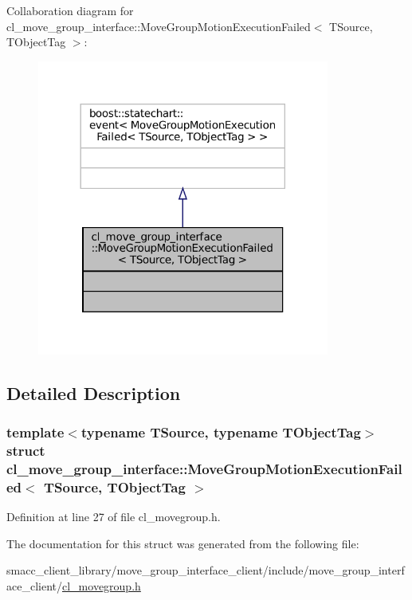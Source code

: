 Collaboration diagram for cl\+\_\+move\+\_\+group\+\_\+interface\+:\+:Move\+Group\+Motion\+Execution\+Failed$<$ T\+Source, T\+Object\+Tag $>$\+:
\nopagebreak
\begin{figure}[H]
\begin{center}
\leavevmode
\includegraphics[width=272pt]{structcl__move__group__interface_1_1MoveGroupMotionExecutionFailed__coll__graph}
\end{center}
\end{figure}


\subsection{Detailed Description}
\subsubsection*{template$<$typename T\+Source, typename T\+Object\+Tag$>$\newline
struct cl\+\_\+move\+\_\+group\+\_\+interface\+::\+Move\+Group\+Motion\+Execution\+Failed$<$ T\+Source, T\+Object\+Tag $>$}



Definition at line 27 of file cl\+\_\+movegroup.\+h.



The documentation for this struct was generated from the following file\+:\begin{DoxyCompactItemize}
\item 
smacc\+\_\+client\+\_\+library/move\+\_\+group\+\_\+interface\+\_\+client/include/move\+\_\+group\+\_\+interface\+\_\+client/\hyperlink{cl__movegroup_8h}{cl\+\_\+movegroup.\+h}\end{DoxyCompactItemize}
